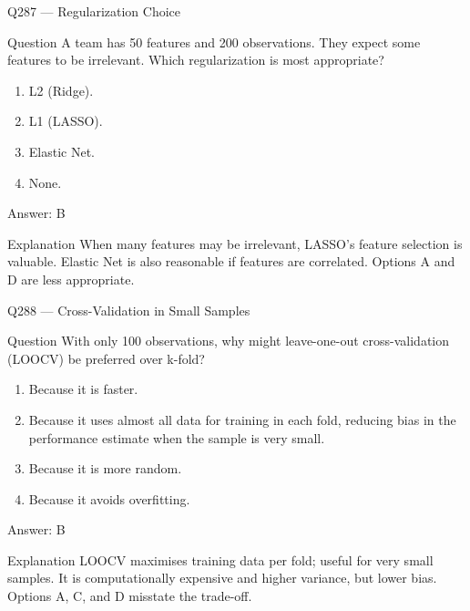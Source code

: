 \documentclass[aspectratio=169,8pt]{beamer}
\begin{document}
\begin{frame}{Q287 --- Regularization Choice}
\begin{block}{Question}
A team has 50 features and 200 observations. They expect some features to be irrelevant. Which regularization is most appropriate?
\begin{enumerate}
\item L2 (Ridge).
\item L1 (LASSO).
\item Elastic Net.
\item None.
\end{enumerate} \end{block}
\begin{exampleblock}{Answer: B}\end{exampleblock}
\begin{block}{Explanation}
When many features may be irrelevant, LASSO's feature selection is valuable. Elastic Net is also reasonable if features are correlated. Options A and D are less appropriate.
\end{block}
\end{frame}

\begin{frame}{Q288 --- Cross-Validation in Small Samples}
\begin{block}{Question}
With only 100 observations, why might leave-one-out cross-validation (LOOCV) be preferred over k-fold?
\begin{enumerate}
\item Because it is faster.
\item Because it uses almost all data for training in each fold, reducing bias in the performance estimate when the sample is very small.
\item Because it is more random.
\item Because it avoids overfitting.
\end{enumerate} \end{block}
\begin{exampleblock}{Answer: B}\end{exampleblock}
\begin{block}{Explanation}
LOOCV maximises training data per fold; useful for very small samples. It is computationally expensive and higher variance, but lower bias. Options A, C, and D misstate the trade-off.
\end{block}
\end{frame}
\end{document}
